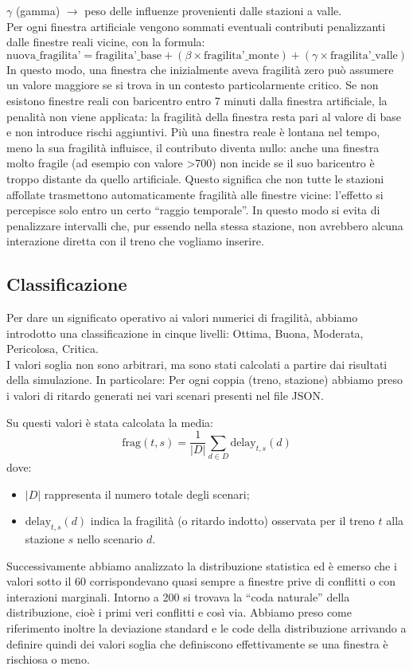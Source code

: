 \documentclass[a4paper,12pt]{report}
\begin{document}
$\gamma$ (gamma) $\rightarrow$ peso delle influenze provenienti dalle stazioni a valle.  \\ Per ogni finestra artificiale vengono sommati eventuali contributi penalizzanti dalle finestre reali vicine, con la formula:
\[\text{nuova\_fragilita'} = \text{fragilita'\_base} + (\beta \times \text{fragilita'\_monte}) + (\gamma \times \text{fragilita'\_valle})\]
In questo modo, una finestra che inizialmente aveva fragilità zero può assumere un valore maggiore se si trova in un contesto particolarmente critico.
Se non esistono finestre reali con baricentro entro 7 minuti dalla finestra artificiale, la penalità non viene applicata: la fragilità della finestra resta pari al valore di base e non introduce rischi aggiuntivi. Più una finestra reale è lontana nel tempo, meno la sua fragilità influisce, il contributo diventa nullo: anche una finestra molto fragile (ad esempio con valore >700) non incide se il suo baricentro è troppo distante da quello artificiale.
Questo significa che non tutte le stazioni affollate trasmettono automaticamente fragilità alle finestre vicine: l’effetto si percepisce solo entro un certo “raggio temporale”. In questo modo si evita di penalizzare intervalli che, pur essendo nella stessa stazione, non avrebbero alcuna interazione diretta con il treno che vogliamo inserire.

\subsection{Classificazione}
Per dare un significato operativo ai valori numerici di fragilità, abbiamo introdotto una classificazione in cinque livelli: Ottima, Buona, Moderata, Pericolosa, Critica. \\ 
I valori soglia non sono arbitrari, ma sono stati calcolati a partire dai risultati della simulazione. In particolare: 
Per ogni coppia (treno, stazione) abbiamo preso i valori di ritardo generati nei vari scenari presenti nel file JSON.

Su questi valori è stata calcolata la media:
\begin{equation}
\text{frag}(t,s) = \frac{1}{|D|} \sum_{d \in D} \text{delay}_{t,s}(d)
\end{equation}
dove:
\begin{itemize}
    \item $|D|$ rappresenta il numero totale degli scenari;
    \item $\text{delay}_{t,s}(d)$ indica la fragilità (o ritardo indotto) 
    osservata per il treno $t$ alla stazione $s$ nello scenario $d$.
\end{itemize}
Successivamente abbiamo analizzato la distribuzione statistica ed è emerso che i valori sotto il 60 corrispondevano quasi sempre a finestre prive di conflitti o con interazioni marginali. 
Intorno a 200 si trovava la “coda naturale” della distribuzione, cioè i primi veri conflitti e così via.
Abbiamo preso come riferimento inoltre la deviazione standard e le code della distribuzione arrivando a definire quindi dei valori soglia che definiscono effettivamente se una finestra è rischiosa o meno.
\end{document}
